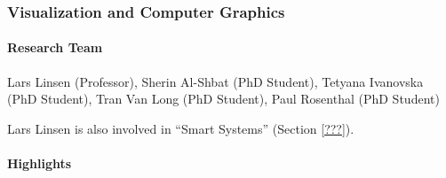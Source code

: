 
%

\subsubsection{Visualization and Computer Graphics}

\paragraph{Research Team}
Lars Linsen (Professor),
Sherin Al-Shbat (PhD Student),
Tetyana Ivanovska (PhD Student),
Tran Van Long (PhD Student),
Paul Rosenthal (PhD Student)

\medskip

Lars Linsen is also involved in  ``Smart Systems''
  (Section \ref{???}). %

%
%
%


\paragraph{Highlights} \strut

